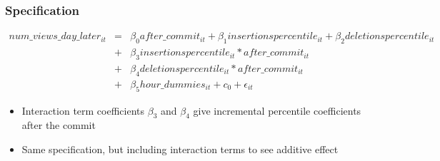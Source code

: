 \documentclass[xcolor=pdftex,dvipsnames,table]{beamer}
\begin{document}
\frame
{
    \frametitle{Specification}
    \begin{eqnarray}
    num\_views\_day\_later_{it} &=& \beta_0 after\_commit_{it} + \beta_1 insertionspercentile_{it} + \beta_2 deletionspercentile_{it} \\ \nonumber
    &+& \beta_3 insertionspercentile_{it} * after\_commit_{it} \\ \nonumber
    &+& \beta_4 deletionspercentile_{it} * after\_commit_{it} \\ \nonumber
    &+& \beta_5 hour\_dummies_{it} + c_0 +  \epsilon_{it}
    \end{eqnarray}

    \begin{itemize}
        \item Interaction term coefficients $\beta_3$ and $\beta_4$ give incremental percentile coefficients after the commit
        \item Same specification, but including interaction terms to see additive effect
    \end{itemize}
}
\end{document}
